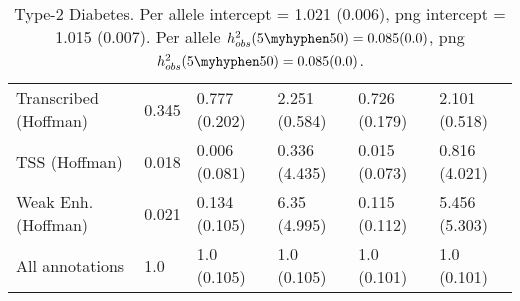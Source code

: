 \documentclass[11pt]{article}
\begin{document}
\begin{table}[H]
\begin{center}
\begin{tabular}{l|lllll}
Transcribed (Hoffman)  &  0.345 & 0.777 (0.202) & 2.251 (0.584) &
0.726 (0.179) & 2.101 (0.518) \\
TSS (Hoffman)  &  0.018 & 0.006 (0.081) & 0.336 (4.435) &
0.015 (0.073) & 0.816 (4.021) \\
Weak Enh. (Hoffman)  &  0.021 & 0.134 (0.105) & 6.35 (4.995) &
0.115 (0.112) & 5.456 (5.303) \\
All annotations  &  1.0 & 1.0 (0.105) & 1.0 (0.105) &
1.0 (0.101) & 1.0 (0.101) \\
\end{tabular}
\caption{Type-2 Diabetes.
Per allele intercept = 1.021 (0.006),
png intercept = 1.015 (0.007).
Per allele $h^2_{obs}(5\myhyphen50) = 0.085 (0.0)$,
png $h^2_{obs}(5\myhyphen50) = 0.085 (0.0)$.}
\end{center}
\end{table}
\end{document}
